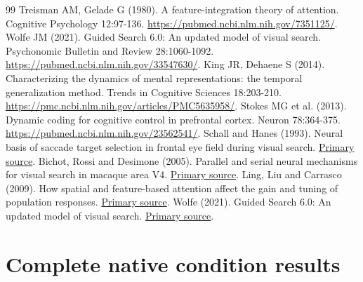 \documentclass[11pt]{article}
\begin{document}
\begin{thebibliography}{99}
 Treisman AM, Gelade G (1980). A feature-integration theory of attention. Cognitive Psychology 12:97-136. \url{https://pubmed.ncbi.nlm.nih.gov/7351125/}.
 Wolfe JM (2021). Guided Search 6.0: An updated model of visual search. Psychonomic Bulletin and Review 28:1060-1092. \url{https://pubmed.ncbi.nlm.nih.gov/33547630/}.
 King JR, Dehaene S (2014). Characterizing the dynamics of mental representations: the temporal generalization method. Trends in Cognitive Sciences 18:203-210. \url{https://pmc.ncbi.nlm.nih.gov/articles/PMC5635958/}.
 Stokes MG et al. (2013). Dynamic coding for cognitive control in prefrontal cortex. Neuron 78:364-375. \url{https://pubmed.ncbi.nlm.nih.gov/23562541/}.
 Schall and Hanes (1993). Neural basis of saccade target selection in frontal eye field during visual search. \href{https://pubmed.ncbi.nlm.nih.gov/8247155/}{Primary source}.
 Bichot, Rossi and Desimone (2005). Parallel and serial neural mechanisms for visual search in macaque area V4. \href{https://doi.org/10.1126/science.1109676}{Primary source}.
 Ling, Liu and Carrasco (2009). How spatial and feature-based attention affect the gain and tuning of population responses. \href{https://pmc.ncbi.nlm.nih.gov/articles/PMC2696585/}{Primary source}.
 Wolfe (2021). Guided Search 6.0: An updated model of visual search. \href{https://doi.org/10.3758/s13423-020-01859-9}{Primary source}.
\end{thebibliography}\clearpage\appendix\section{Complete native condition results}
\end{document}
